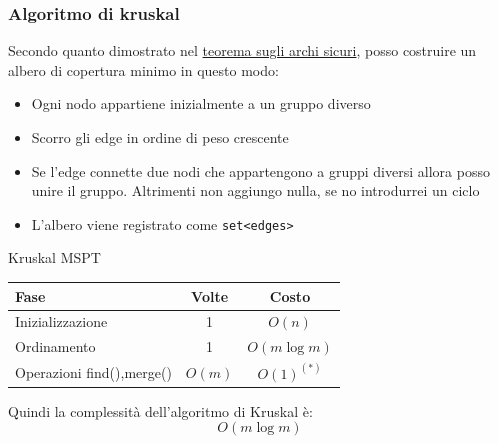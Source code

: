 \subsubsection{Algoritmo di kruskal}\label{algoritmo di kruskal}
Secondo quanto dimostrato nel \hyperref[archi sicuri]{teorema sugli archi sicuri}, posso costruire un albero di copertura minimo in questo modo:
\begin{itemize}
	\item Ogni nodo appartiene inizialmente a un gruppo diverso
	\item Scorro gli edge in ordine di peso crescente
	\item Se l'edge connette due nodi che appartengono a gruppi diversi allora posso unire il gruppo. Altrimenti non aggiungo nulla, se no introdurrei un ciclo
	\item L'albero viene registrato come \verb|set<edges>|
\end{itemize}

\begin{algoritmo}{Kruskal MSPT}
	\begin{algorithm}[H]
		\caption{Kruskal's Algorithm}


	\end{algorithm}
\end{algoritmo}

\begin{center}
	\begin{tabular}{lcc}
		\toprule
		Fase                                              & Volte  & Costo         \\
		\midrule
		Inizializzazione                                  & 1      & $O(n)$        \\
		Ordinamento                                       & 1      & $O(m \log m)$ \\
		Operazioni {\ttfamily find()},{\ttfamily merge()} & $O(m)$ & $O(1)^{(*)}$  \\
		\bottomrule
	\end{tabular}
\end{center}
Quindi la complessità dell'algoritmo di Kruskal è:
\[
	O\left(m \log m\right)
\]

